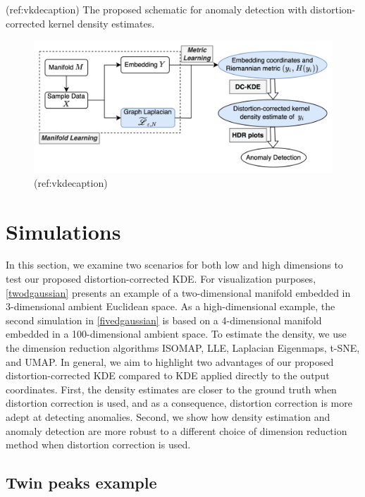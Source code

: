 \documentclass[
]{article}
\begin{document}
(ref:vkdecaption) The proposed schematic for anomaly detection with
distortion-corrected kernel density estimates.

\begin{figure}

{\centering \includegraphics[width=0.95\linewidth]{figures/DC-KDE} 

}

\caption{(ref:vkdecaption)}\label{fig:vkde}
\end{figure}

\hypertarget{simulation}{%
\section{Simulations}\label{simulation}}

In this section, we examine two scenarios for both low and high
dimensions to test our proposed distortion-corrected KDE. For
visualization purposes, \autoref{twodgaussian} presents an example of a
two-dimensional manifold embedded in 3-dimensional ambient Euclidean
space. As a high-dimensional example, the second simulation in
\autoref{fivedgaussian} is based on a 4-dimensional manifold embedded in
a 100-dimensional ambient space. To estimate the density, we use the
dimension reduction algorithms ISOMAP, LLE, Laplacian Eigenmaps, t-SNE,
and UMAP. In general, we aim to highlight two advantages of our proposed
distortion-corrected KDE compared to KDE applied directly to the output
coordinates. First, the density estimates are closer to the ground truth
when distortion correction is used, and as a consequence, distortion
correction is more adept at detecting anomalies. Second, we show how
density estimation and anomaly detection are more robust to a different
choice of dimension reduction method when distortion correction is used.

\hypertarget{twodgaussian}{%
\subsection{Twin peaks example}\label{twodgaussian}}
\end{document}
